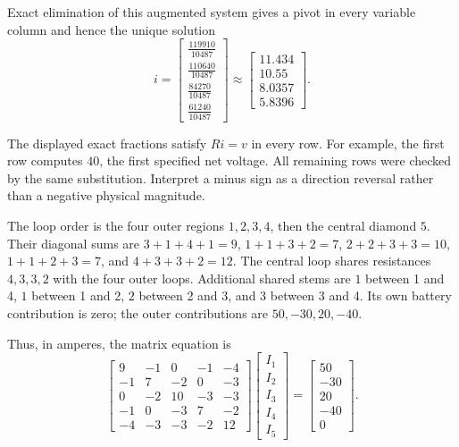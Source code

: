 Exact elimination of this augmented system gives a pivot in every variable column and hence the unique solution
\[ i=\begin{bmatrix}\frac{119910}{10487}\\\frac{110640}{10487}\\\frac{84270}{10487}\\\frac{61240}{10487}\end{bmatrix}\approx \begin{bmatrix}11.434\\10.55\\8.0357\\5.8396\end{bmatrix}.\]

The displayed exact fractions satisfy $Ri=v$ in every row. For example, the first row computes $40$, the first specified net voltage. All remaining rows were checked by the same substitution. Interpret a minus sign as a direction reversal rather than a negative physical magnitude.



The loop order is the four outer regions $1,2,3,4$, then the central diamond $5$. Their diagonal sums are $3+1+4+1=9$, $1+1+3+2=7$, $2+2+3+3=10$, $1+1+2+3=7$, and $4+3+3+2=12$. The central loop shares resistances $4,3,3,2$ with the four outer loops. Additional shared stems are $1$ between 1 and 4, $1$ between 1 and 2, $2$ between 2 and 3, and $3$ between 3 and 4. Its own battery contribution is zero; the outer contributions are $50,-30,20,-40$.

Thus, in amperes, the matrix equation is
\[ \begin{bmatrix}9 & -1 & 0 & -1 & -4\\-1 & 7 & -2 & 0 & -3\\0 & -2 & 10 & -3 & -3\\-1 & 0 & -3 & 7 & -2\\-4 & -3 & -3 & -2 & 12\end{bmatrix}\begin{bmatrix}I_{1}\\I_{2}\\I_{3}\\I_{4}\\I_{5}\end{bmatrix}=\begin{bmatrix}50\\-30\\20\\-40\\0\end{bmatrix}.\]

